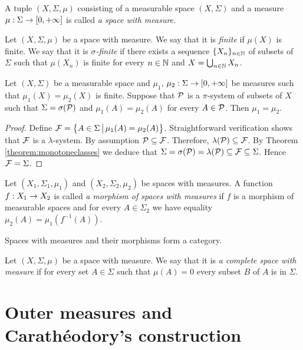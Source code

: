 \begin{definition}
A tuple $(X,\Sigma,\mu)$ consisting of a measurable space $\left(X,\Sigma\right)$ and a measure $\mu:\Sigma \rightarrow [0,+\infty]$ is called \textit{a space with measure}.
\end{definition}

\begin{definition}
Let $(X,\Sigma,\mu)$ be a space with measure. We say that it is \textit{finite} if $\mu(X)$ is finite. We say that it is \textit{$\sigma$-finite} if there exists a sequence $\{X_n\}_{n\in {\mathbb N}}$ of subsets of $\Sigma$ such that $\mu(X_n)$ is finite for every $n\in {\mathbb N}$ and $X=\bigcup_{n\in {\mathbb N}}X_n$.
\end{definition}

\begin{theorem}\label{theorem:uniquenessonpisystem}
Let $(X,\Sigma)$ be a measurable space and $\mu_1$, $\mu_2:\Sigma\rightarrow [0,+\infty]$ be measures such that $\mu_1(X)=\mu_2(X)$ is finite. Suppose that ${\mathcal P}$ is a $\pi$-system of subsets of $X$ such that $\Sigma=\sigma({\mathcal P})$ and $\mu_1(A)=\mu_2(A)$ for every $A\in {\mathcal P}$. Then $\mu_1=\mu_2$.
\end{theorem}
\begin{proof}
Define ${\mathcal F}=\big\{A\in \Sigma\,\big|\,\mu_1(A)=\mu_2(A)\big\}$. Straightforward verification shows that ${\mathcal F}$ is a $\lambda$-system. By assumption ${\mathcal P}\subseteq {\mathcal F}$. Therefore, $\lambda({\mathcal P})\subseteq {\mathcal F}$. By Theorem \ref{theorem:monotoneclasses} we deduce that $\Sigma=\sigma({\mathcal P})=\lambda({\mathcal P})\subseteq {\mathcal F}\subseteq \Sigma$. Hence ${\mathcal F}=\Sigma$.
\end{proof}

\begin{definition}
Let $(X_1,\Sigma_1,\mu_1)$ and $(X_2,\Sigma_2,\mu_2)$ be spaces with measures. A function $f:X_1\rightarrow X_2$ is called \textit{a morphism of spaces with measures} if $f$ is a morphism of measurable spaces and for every $A\in \Sigma_2$ we have equality $\mu_2(A)=\mu_1(f^{-1}(A))$.
\end{definition}
\noindent
Spaces with measures and their morphisms form a category.

\begin{definition}
Let $(X,\Sigma,\mu)$ be a space with measure. We say that it is \textit{a complete space with measure} if for every set $A\in \Sigma$ such that $\mu(A)=0$ every subset $B$ of $A$ is in $\Sigma$.
\end{definition}

\section{Outer measures and Carath{\'e}odory's construction}

